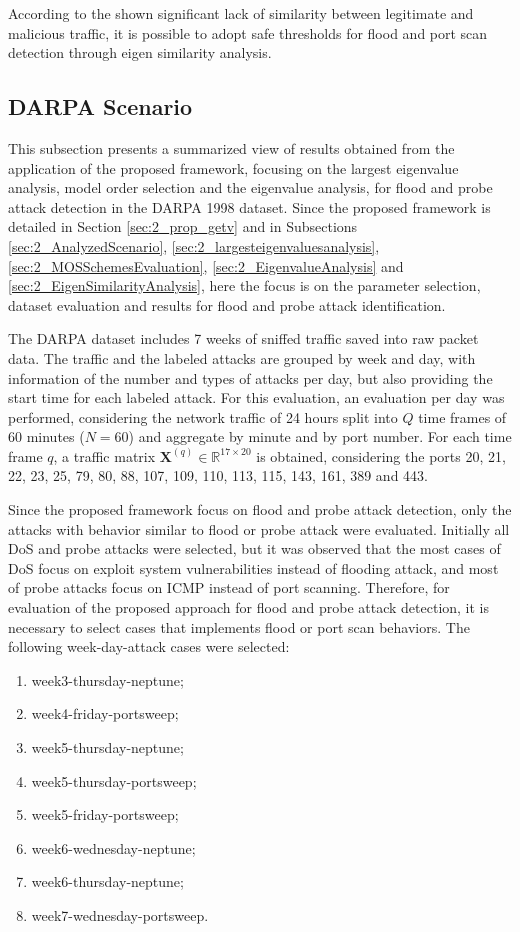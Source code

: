 According to the shown significant lack of similarity between legitimate and malicious traffic, it is possible to adopt safe thresholds for flood and port scan detection through eigen similarity analysis.

\subsection{DARPA Scenario}
\label{sec:2_DarpaEvaluation}

This subsection presents a summarized view of results obtained from the application of the proposed framework, focusing on the largest eigenvalue analysis, model order selection and the eigenvalue analysis, for flood and probe attack detection in the DARPA 1998 dataset. Since the proposed framework is detailed in Section \ref{sec:2_prop_getv} and in Subsections \ref{sec:2_AnalyzedScenario}, \ref{sec:2_largesteigenvaluesanalysis}, \ref{sec:2_MOSSchemesEvaluation}, \ref{sec:2_EigenvalueAnalysis} and \ref{sec:2_EigenSimilarityAnalysis}, here the focus is on the parameter selection, dataset evaluation and results for flood and probe attack identification.

The DARPA dataset includes 7 weeks of sniffed traffic saved into raw packet data. The traffic and the labeled attacks are grouped by week and day, with information of the number and types of attacks per day, but also providing the start time for each labeled attack. For this evaluation, an evaluation per day was performed, considering the network traffic of 24 hours split into $Q$ time frames of 60 minutes ($N = 60$) and aggregate by minute and by port number. For each time frame $q$, a traffic matrix $\boldsymbol{X}^{(q)} \in \mathbb{R}^{17 \times 20}$ is obtained, considering the ports 20, 21, 22, 23, 25, 79, 80, 88, 107, 109, 110, 113, 115, 143, 161, 389 and 443.

Since the proposed framework focus on flood and probe attack detection, only the attacks with behavior similar to flood or probe attack were evaluated. Initially all DoS and probe attacks were selected, but it was observed that the most cases of DoS focus on exploit system vulnerabilities instead of flooding attack, and most of probe attacks focus on ICMP instead of port scanning. Therefore, for evaluation of the proposed approach for flood and probe attack detection, it is necessary to select cases that implements flood or port scan behaviors. The following week-day-attack cases  were selected: 

\begin{enumerate}
	\item week3-thursday-neptune;
	\item week4-friday-portsweep;
	\item week5-thursday-neptune;
	\item week5-thursday-portsweep;
	\item week5-friday-portsweep;
	\item week6-wednesday-neptune;
	\item week6-thursday-neptune;
	\item week7-wednesday-portsweep.
\end{enumerate}

